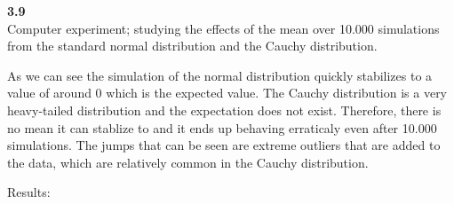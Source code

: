 \newpage\noindent
\textbf{3.9}\\  %
Computer experiment; studying the effects of the mean over 10.000 simulations from the standard normal
distribution and the Cauchy distribution.

As we can see the simulation of the normal distribution quickly stabilizes to a value of around 0 which
is the expected value. The Cauchy distribution is a very heavy-tailed distribution and the expectation does
not exist. Therefore, there is no mean it can stablize to and it ends up behaving erraticaly even after
10.000 simulations. The jumps that can be seen are extreme outliers that are added to the data, which
are relatively common in the Cauchy distribution.

Results:
